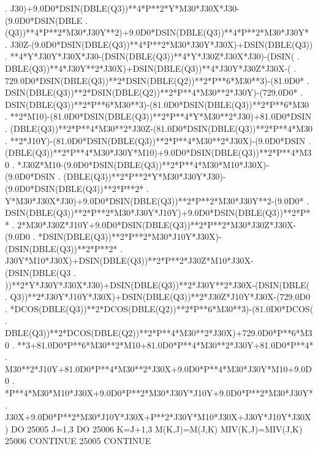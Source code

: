 \begin{framedverbatim}
     . J30)+9.0D0*DSIN(DBLE(Q3))**4*P**2*Y*M30*J30X*J30-(9.0D0*DSIN(DBLE
     . (Q3))**4*P**2*M30*J30Y**2)+9.0D0*DSIN(DBLE(Q3))**4*P**2*M30*J30Y*
     . J30Z-(9.0D0*DSIN(DBLE(Q3))**4*P**2*M30*J30Y*J30X)+DSIN(DBLE(Q3))
     . **4*Y*J30Y*J30X*J30-(DSIN(DBLE(Q3))**4*Y*J30Z*J30X*J30)-(DSIN(
     . DBLE(Q3))**4*J30Y**2*J30X)+DSIN(DBLE(Q3))**4*J30Y*J30Z*J30X-(
     . 729.0D0*DSIN(DBLE(Q3))**2*DSIN(DBLE(Q2))**2*P**6*M30**3)-(81.0D0*
     . DSIN(DBLE(Q3))**2*DSIN(DBLE(Q2))**2*P**4*M30**2*J30Y)-(729.0D0*
     . DSIN(DBLE(Q3))**2*P**6*M30**3)-(81.0D0*DSIN(DBLE(Q3))**2*P**6*M30
     . **2*M10)-(81.0D0*DSIN(DBLE(Q3))**2*P**4*Y*M30**2*J30)+81.0D0*DSIN
     . (DBLE(Q3))**2*P**4*M30**2*J30Z-(81.0D0*DSIN(DBLE(Q3))**2*P**4*M30
     . **2*J10Y)-(81.0D0*DSIN(DBLE(Q3))**2*P**4*M30**2*J30X)-(9.0D0*DSIN
     . (DBLE(Q3))**2*P**4*M30*J30Y*M10)+9.0D0*DSIN(DBLE(Q3))**2*P**4*M30
     . *J30Z*M10-(9.0D0*DSIN(DBLE(Q3))**2*P**4*M30*M10*J30X)-(9.0D0*DSIN
     . (DBLE(Q3))**2*P**2*Y*M30*J30Y*J30)-(9.0D0*DSIN(DBLE(Q3))**2*P**2*
     . Y*M30*J30X*J30)+9.0D0*DSIN(DBLE(Q3))**2*P**2*M30*J30Y**2-(9.0D0*
     . DSIN(DBLE(Q3))**2*P**2*M30*J30Y*J10Y)+9.0D0*DSIN(DBLE(Q3))**2*P**
     . 2*M30*J30Z*J10Y+9.0D0*DSIN(DBLE(Q3))**2*P**2*M30*J30Z*J30X-(9.0D0
     . *DSIN(DBLE(Q3))**2*P**2*M30*J10Y*J30X)-(DSIN(DBLE(Q3))**2*P**2*
     . J30Y*M10*J30X)+DSIN(DBLE(Q3))**2*P**2*J30Z*M10*J30X-(DSIN(DBLE(Q3
     . ))**2*Y*J30Y*J30X*J30)+DSIN(DBLE(Q3))**2*J30Y**2*J30X-(DSIN(DBLE(
     . Q3))**2*J30Y*J10Y*J30X)+DSIN(DBLE(Q3))**2*J30Z*J10Y*J30X-(729.0D0
     . *DCOS(DBLE(Q3))**2*DCOS(DBLE(Q2))**2*P**6*M30**3)-(81.0D0*DCOS(
     . DBLE(Q3))**2*DCOS(DBLE(Q2))**2*P**4*M30**2*J30X)+729.0D0*P**6*M30
     . **3+81.0D0*P**6*M30**2*M10+81.0D0*P**4*M30**2*J30Y+81.0D0*P**4*
     . M30**2*J10Y+81.0D0*P**4*M30**2*J30X+9.0D0*P**4*M30*J30Y*M10+9.0D0
     . *P**4*M30*M10*J30X+9.0D0*P**2*M30*J30Y*J10Y+9.0D0*P**2*M30*J30Y*
     . J30X+9.0D0*P**2*M30*J10Y*J30X+P**2*J30Y*M10*J30X+J30Y*J10Y*J30X)
      DO 25005 J=1,3
          DO 25006 K=J+1,3
              M(K,J)=M(J,K)
              MIV(K,J)=MIV(J,K)
25006     CONTINUE
25005 CONTINUE
\end{framedverbatim}

\newpage


